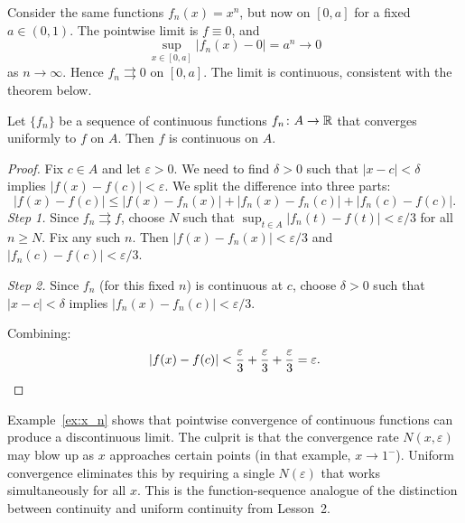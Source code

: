 \documentclass[11pt,a4paper]{article}
\begin{document}
\begin{example}
\label{ex:x_n_restricted}
Consider the same functions $f_n(x) = x^n$, but now on $[0, a]$ for a
fixed $a \in (0, 1)$. The pointwise limit is $f \equiv 0$, and
\[
  \sup_{x \in [0, a]} |f_n(x) - 0| = a^n \to 0
\]
as $n \to \infty$. Hence $f_n \rightrightarrows 0$ on $[0, a]$. The
limit is continuous, consistent with the theorem below.
\end{example}

\begin{keyresult}[title={Uniform Limit of Continuous Functions}]
\begin{theorem}
\label{thm:uniform_limit_continuous}
Let $\{f_n\}$ be a sequence of continuous functions
$f_n \colon A \to \mathbb{R}$ that converges uniformly to $f$ on $A$. Then $f$
is continuous on $A$.
\end{theorem}
\end{keyresult}

\begin{proof}
Fix $c \in A$ and let $\varepsilon > 0$. We need to find $\delta > 0$
such that $|x - c| < \delta$ implies $|f(x) - f(c)| < \varepsilon$.
We split the difference into three parts:
\[
  |f(x) - f(c)| \le |f(x) - f_n(x)| + |f_n(x) - f_n(c)|
  + |f_n(c) - f(c)|.
\]
\emph{Step 1.} Since $f_n \rightrightarrows f$, choose $N$ such that
$\sup_{t \in A} |f_n(t) - f(t)| < \varepsilon/3$ for all $n \ge N$.
Fix any such $n$. Then $|f(x) - f_n(x)| < \varepsilon/3$ and
$|f_n(c) - f(c)| < \varepsilon/3$.

\emph{Step 2.} Since $f_n$ (for this fixed $n$) is continuous at $c$,
choose $\delta > 0$ such that $|x - c| < \delta$ implies
$|f_n(x) - f_n(c)| < \varepsilon/3$.

Combining:
\[
  |f(x) - f(c)| < \frac{\varepsilon}{3} + \frac{\varepsilon}{3}
  + \frac{\varepsilon}{3} = \varepsilon. \qedhere
\]
\end{proof}

\begin{warning}[title={Pointwise convergence does not preserve continuity}]
Example~\ref{ex:x_n} shows that pointwise convergence of continuous
functions can produce a discontinuous limit. The culprit is that the
convergence rate $N(x, \varepsilon)$ may blow up as $x$ approaches
certain points (in that example, $x \to 1^-$). Uniform convergence
eliminates this by requiring a single $N(\varepsilon)$ that works
simultaneously for all $x$. This is the function-sequence analogue of
the distinction between continuity and uniform continuity from Lesson~2.
\end{warning}
\end{document}
